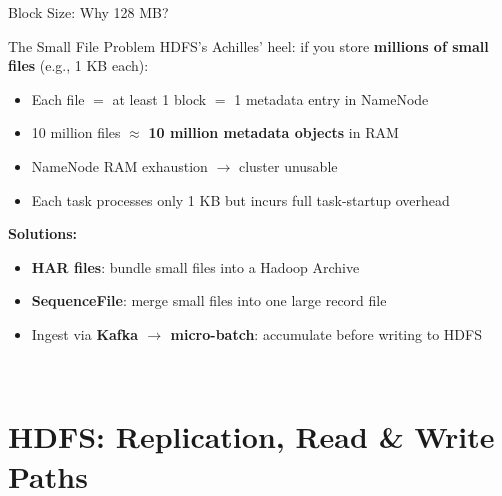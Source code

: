 \documentclass[aspectratio=169,10pt]{beamer}
\begin{document}
\begin{frame}{Block Size: Why 128 MB?}
  
      \begin{alertblock}{The Small File Problem}
        HDFS's Achilles' heel: if you store \textbf{millions of small files} (e.g., 1 KB each):
        \vspace{4pt}
        \begin{itemize}
          \item Each file $=$ at least 1 block $=$ 1 metadata entry in NameNode
          \item 10 million files $\approx$ \textbf{10 million metadata objects} in RAM
          \item NameNode RAM exhaustion $\to$ cluster unusable
          \item Each task processes only 1 KB but incurs full task-startup overhead
        \end{itemize}
        \vspace{4pt}
        \textbf{Solutions:}
        \begin{itemize}
          \small
          \item \textbf{HAR files}: bundle small files into a Hadoop Archive
          \item \textbf{SequenceFile}: merge small files into one large record file
          \item Ingest via \textbf{Kafka $\to$ micro-batch}: accumulate before writing to HDFS
        \end{itemize}
      \end{alertblock}
  \ 
\end{frame}
\section{HDFS: Replication, Read \& Write Paths}
\end{document}
